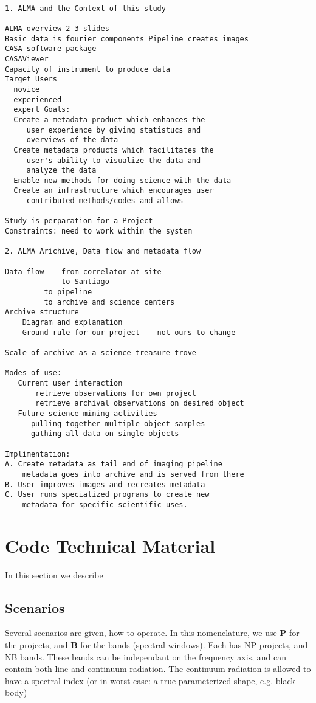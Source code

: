 \documentclass[preprint]{aastex} %
\begin{document}
\begin{verbatim}

1. ALMA and the Context of this study

ALMA overview 2-3 slides
Basic data is fourier components Pipeline creates images
CASA software package
CASAViewer
Capacity of instrument to produce data
Target Users
  novice
  experienced
  expert Goals:
  Create a metadata product which enhances the
     user experience by giving statistucs and
     overviews of the data
  Create metadata products which facilitates the
     user's ability to visualize the data and
     analyze the data
  Enable new methods for doing science with the data
  Create an infrastructure which encourages user
     contributed methods/codes and allows

Study is perparation for a Project
Constraints: need to work within the system

2. ALMA Arichive, Data flow and metadata flow

Data flow -- from correlator at site
             to Santiago
         to pipeline
         to archive and science centers
Archive structure
    Diagram and explanation
    Ground rule for our project -- not ours to change

Scale of archive as a science treasure trove

Modes of use:
   Current user interaction
       retrieve observations for own project
       retrieve archival observations on desired object
   Future science mining activities
      pulling together multiple object samples
      gathing all data on single objects

Implimentation:
A. Create metadata as tail end of imaging pipeline
    metadata goes into archive and is served from there
B. User improves images and recreates metadata
C. User runs specialized programs to create new
    metadata for specific scientific uses.

\end{verbatim}

\section{Code Technical Material}

In this section we describe

\subsection{Scenarios}

Several scenarios are given, how to operate.  In this nomenclature, we use {\bf P} for
the projects, and {\bf B} for the bands (spectral windows). Each has NP projects, and 
NB bands. These bands can be independant on the frequency axis, and can contain
both line and continuum radiation. The continuum radiation is allowed to have a spectral
index (or in worst case: a true parameterized shape, e.g. black body)
\end{document}
